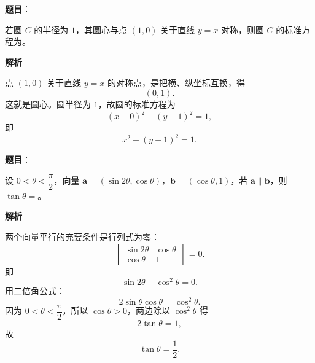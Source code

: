 \begin{answer}

\textbf{题目}：

若圆 $C$ 的半径为 $1$，其圆心与点 $(1,0)$ 关于直线 $y=x$ 对称，则圆 $C$ 的标准方程为\gkblank{}。

\textbf{解析}

点 $(1,0)$ 关于直线 $y=x$ 的对称点，是把横、纵坐标互换，得
\nopagebreak[4]
\[(0,1).\]
这就是圆心。圆半径为 $1$，故圆的标准方程为
\nopagebreak[4]
\[(x-0)^2+(y-1)^2=1,\]
即
\nopagebreak[4]
\[x^2+(y-1)^2=1.\]


\end{answer}
\begin{answer}

\textbf{题目}：

设 $0<\theta<\dfrac\pi2$，向量 $\boldsymbol a=(\sin2\theta,\cos\theta)$，$\boldsymbol b=(\cos\theta,1)$，若 $\boldsymbol a\parallel\boldsymbol b$，则 $\tan\theta=$\gkblank{}。

\textbf{解析}

两个向量平行的充要条件是行列式为零：
\nopagebreak[4]
\[\begin{vmatrix}
\sin2\theta & \cos\theta\\
\cos\theta & 1
\end{vmatrix}=0.\]
即
\nopagebreak[4]
\[\sin2\theta-\cos^2\theta=0.\]
用二倍角公式：
\nopagebreak[4]
\[2\sin\theta\cos\theta=\cos^2\theta.\]
因为 $0<\theta<\dfrac\pi2$，所以 $\cos\theta>0$，两边除以 $\cos^2\theta$ 得
\nopagebreak[4]
\[2\tan\theta=1,\]
故
\nopagebreak[4]
\[\tan\theta=\frac12.\]


\end{answer}
